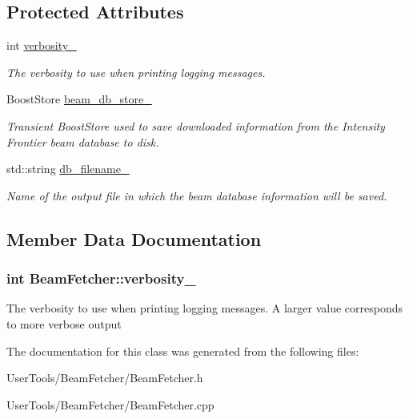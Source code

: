 \subsection*{Protected Attributes}
\begin{DoxyCompactItemize}
\item 
int \hyperlink{classBeamFetcher_ab78e5092f1cd5b0544fe6b587282c968}{verbosity\_\-}
\begin{DoxyCompactList}\small\item\em The verbosity to use when printing logging messages. \item\end{DoxyCompactList}\item 
\hypertarget{classBeamFetcher_ac9e8e1c53a2f06c00be83258be22400d}{
BoostStore \hyperlink{classBeamFetcher_ac9e8e1c53a2f06c00be83258be22400d}{beam\_\-db\_\-store\_\-}}
\label{classBeamFetcher_ac9e8e1c53a2f06c00be83258be22400d}

\begin{DoxyCompactList}\small\item\em Transient BoostStore used to save downloaded information from the Intensity Frontier beam database to disk. \item\end{DoxyCompactList}\item 
\hypertarget{classBeamFetcher_a6e37759beec5bc578d7d4de539329bce}{
std::string \hyperlink{classBeamFetcher_a6e37759beec5bc578d7d4de539329bce}{db\_\-filename\_\-}}
\label{classBeamFetcher_a6e37759beec5bc578d7d4de539329bce}

\begin{DoxyCompactList}\small\item\em Name of the output file in which the beam database information will be saved. \item\end{DoxyCompactList}\end{DoxyCompactItemize}


\subsection{Member Data Documentation}
\hypertarget{classBeamFetcher_ab78e5092f1cd5b0544fe6b587282c968}{
\subsubsection[{verbosity\_\-}]{\setlength{\rightskip}{0pt plus 5cm}int {\bf BeamFetcher::verbosity\_\-}}}
\label{classBeamFetcher_ab78e5092f1cd5b0544fe6b587282c968}


The verbosity to use when printing logging messages. A larger value corresponds to more verbose output 

The documentation for this class was generated from the following files:\begin{DoxyCompactItemize}
\item 
UserTools/BeamFetcher/BeamFetcher.h\item 
UserTools/BeamFetcher/BeamFetcher.cpp\end{DoxyCompactItemize}
